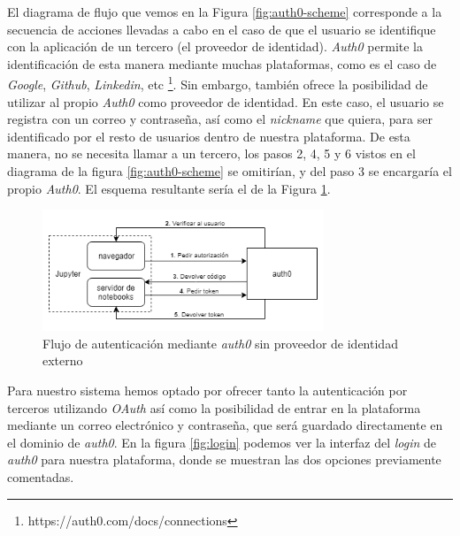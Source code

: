 \documentclass[11pt,spanish,listoffigures]{tfgetsinf}
\begin{document}
El diagrama de flujo que vemos en la Figura \ref{fig:auth0-scheme} corresponde a la secuencia de acciones llevadas a cabo en el caso de que el usuario se identifique con la aplicación de un tercero (el proveedor de identidad). \textit{Auth0} permite la identificación de esta manera mediante muchas plataformas, como es el caso de \textit{Google}, \textit{Github}, \textit{Linkedin}, etc \footnote{https://auth0.com/docs/connections}. Sin embargo, también ofrece la posibilidad de utilizar al propio \textit{Auth0} como proveedor de identidad. En este caso, el usuario se registra con un correo y contraseña, así como el \textit{nickname} que quiera, para ser identificado por el resto de usuarios dentro de nuestra plataforma. De esta manera, no se necesita llamar a un tercero, los pasos 2, 4, 5 y 6 vistos en el diagrama de la figura \ref{fig:auth0-scheme} se omitirían, y del paso 3 se encargaría el propio \textit{Auth0}. El esquema resultante sería el de la Figura \ref{fig:auth0-scheme-2}.  

\begin{figure}[h]
	\centering
  	\includegraphics[width=0.75\textwidth]{auth0-flow2.png}
  	\caption{Flujo de autenticación mediante \textit{auth0} sin proveedor de identidad externo}
  	\label{fig:auth0-scheme-2}
\end{figure}

Para nuestro sistema hemos optado por ofrecer tanto la autenticación por terceros utilizando \textit{OAuth} así como la posibilidad de entrar en la plataforma mediante un correo electrónico y contraseña, que será guardado directamente en el dominio de \textit{auth0}. En la figura \ref{fig:login} podemos ver la interfaz del \textit{login} de \textit{auth0} para nuestra plataforma, donde se muestran las dos opciones previamente comentadas.
\end{document}
